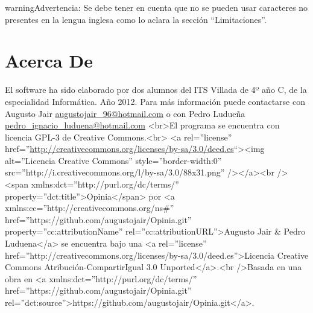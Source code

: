 \documentclass[letterpaper,10pt,spanish]{sphinxmanual}
\begin{document}
\begin{notice}{warning}{Advertencia:}
Se debe tener en cuenta que no se pueden usar caracteres no presentes en la lengua inglesa como lo aclara la sección ``Limitaciones''.
\end{notice}


\section{Acerca De}
\label{Opinia:acerca-de}
El software ha sido elaborado por dos alumnos del ITS Villada de 4º año C, de la especialidad Informática. Año 2012.
Para más información puede contactarse con Augusto Jair \href{mailto:augustojair\_96@hotmail.com}{augustojair\_96@hotmail.com} o con Pedro Ludueña \href{mailto:pedro\_ignacio\_luduena@hotmail.com}{pedro\_ignacio\_luduena@hotmail.com}
\textless{}br\textgreater{}El programa se encuentra con licencia GPL-3 de Creative Commons.\textless{}br\textgreater{}
\textless{}a rel=''license'' href=''\href{http://creativecommons.org/licenses/by-sa/3.0/deed.es}{http://creativecommons.org/licenses/by-sa/3.0/deed.es}``\textgreater{}\textless{}img alt=''Licencia Creative Commons'' style=''border-width:0'' src=''http://i.creativecommons.org/l/by-sa/3.0/88x31.png'' /\textgreater{}\textless{}/a\textgreater{}\textless{}br /\textgreater{}\textless{}span xmlns:dct=''http://purl.org/dc/terms/'' property=''dct:title''\textgreater{}Opinia\textless{}/span\textgreater{} por \textless{}a xmlns:cc=''http://creativecommons.org/ns\#'' href=''https://github.com/augustojair/Opinia.git'' property=''cc:attributionName'' rel=''cc:attributionURL''\textgreater{}Augusto Jair \& Pedro Luduena\textless{}/a\textgreater{} se encuentra bajo una \textless{}a rel=''license'' href=''http://creativecommons.org/licenses/by-sa/3.0/deed.es''\textgreater{}Licencia Creative Commons Atribución-CompartirIgual 3.0 Unported\textless{}/a\textgreater{}.\textless{}br /\textgreater{}Basada en una obra en \textless{}a xmlns:dct=''http://purl.org/dc/terms/'' href=''https://github.com/augustojair/Opinia.git'' rel=''dct:source''\textgreater{}https://github.com/augustojair/Opinia.git\textless{}/a\textgreater{}.
\end{document}
